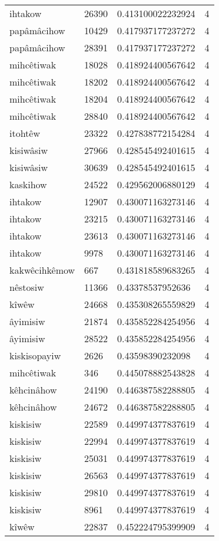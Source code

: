 \begin{longtable}{llll}
ihtakow & 26390 & 0.413100022232924 & 4 \\
papâmâcihow & 10429 & 0.417937177237272 & 4 \\
papâmâcihow & 28391 & 0.417937177237272 & 4 \\
mihcêtiwak & 18028 & 0.418924400567642 & 4 \\
mihcêtiwak & 18202 & 0.418924400567642 & 4 \\
mihcêtiwak & 18204 & 0.418924400567642 & 4 \\
mihcêtiwak & 28840 & 0.418924400567642 & 4 \\
itohtêw & 23322 & 0.427838772154284 & 4 \\
kisiwâsiw & 27966 & 0.428545492401615 & 4 \\
kisiwâsiw & 30639 & 0.428545492401615 & 4 \\
kaskihow & 24522 & 0.429562006880129 & 4 \\
ihtakow & 12907 & 0.430071163273146 & 4 \\
ihtakow & 23215 & 0.430071163273146 & 4 \\
ihtakow & 23613 & 0.430071163273146 & 4 \\
ihtakow & 9978 & 0.430071163273146 & 4 \\
kakwêcihkêmow & 667 & 0.431818589683265 & 4 \\
nêstosiw & 11366 & 0.43378537952636 & 4 \\
kîwêw & 24668 & 0.435308265559829 & 4 \\
âyimisiw & 21874 & 0.435852284254956 & 4 \\
âyimisiw & 28522 & 0.435852284254956 & 4 \\
kiskisopayiw & 2626 & 0.43598390232098 & 4 \\
mihcêtiwak & 346 & 0.445078882543828 & 4 \\
kêhcinâhow & 24190 & 0.446387582288805 & 4 \\
kêhcinâhow & 24672 & 0.446387582288805 & 4 \\
kiskisiw & 22589 & 0.449974377837619 & 4 \\
kiskisiw & 22994 & 0.449974377837619 & 4 \\
kiskisiw & 25031 & 0.449974377837619 & 4 \\
kiskisiw & 26563 & 0.449974377837619 & 4 \\
kiskisiw & 29810 & 0.449974377837619 & 4 \\
kiskisiw & 8961 & 0.449974377837619 & 4 \\
kîwêw & 22837 & 0.452224795399909 & 4 \\

\end{longtable}
